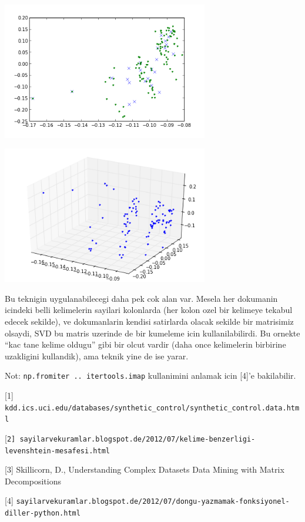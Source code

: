 \documentclass[12pt,fleqn]{article}\usepackage{../common}
\begin{document}
\includegraphics[height=6cm]{svd_5.png}

\includegraphics[height=6cm]{svd_6.png}


Bu teknigin uygulanabilecegi daha pek cok alan var. Mesela her dokumanin
icindeki belli kelimelerin sayilari kolonlarda (her kolon ozel bir kelimeye
tekabul edecek sekilde), ve dokumanlarin kendisi satirlarda olacak sekilde
bir matrisimiz olsaydi, SVD bu matris uzerinde de bir kumeleme icin
kullanilabilirdi. Bu ornekte ``kac tane kelime oldugu'' gibi bir olcut
vardir (daha once kelimelerin birbirine uzakligini kullandik), ama teknik
yine de ise yarar.

Not: \verb!np.fromiter .. itertools.imap! kullanimini anlamak
icin [4]'e bakilabilir.

[1] \verb!kdd.ics.uci.edu/databases/synthetic_control/synthetic_control.data.html!

[\verb!2] sayilarvekuramlar.blogspot.de/2012/07/kelime-benzerligi-levenshtein-mesafesi.html!

[3] Skillicorn, D., Understanding Complex Datasets Data Mining with Matrix Decompositions

[4] \verb!sayilarvekuramlar.blogspot.de/2012/07/dongu-yazmamak-fonksiyonel-diller-python.html!
\end{document}
